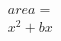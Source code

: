 \documentclass[preview]{standalone}
\begin{document}
\begin{align*}
area = \\ x^2+bx
\end{align*}
\end{document}
